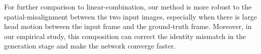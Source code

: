 \documentclass[runningheads]{llncs}
\def\mathbi#1{\textbf{\em #1}}
\begin{document}
 For further comparison to linear-combination, our method is more robust to the spatial-misalignment between the two input images, especially when there is large head motion between the input frame and the ground-truth frame. Moreover, in our empirical study, this composition can correct the identity mismatch in the generation stage and make the network converge faster.


\end{document}
